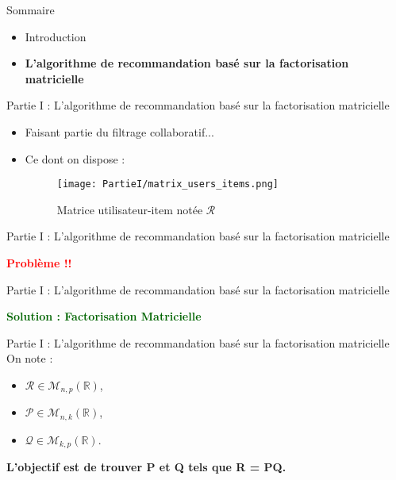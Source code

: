 \newcommand{\PartieI}{Partie I : L'algorithme de recommandation basé sur la factorisation matricielle}

\begin{frame}{Sommaire}
    \begin{itemize}
        \item Introduction
        \item \textbf{L'algorithme de recommandation basé sur la factorisation matricielle}
    \end{itemize}
\end{frame}

\begin{frame}{\PartieI}
    \begin{itemize}
        \item Faisant partie du filtrage collaboratif...
        \item {
              Ce dont on dispose :
              \begin{figure}[htbp]
                  \centering
                  \hspace{80pt}
                  \texttt{[image: PartieI/matrix\_users\_items.png]}
                  \caption{Matrice utilisateur-item notée $\mathcal{R}$}
                  \label{fig:matrix-user-item}
              \end{figure}
              }
    \end{itemize}
\end{frame}

\begin{frame}{\PartieI}
    \begin{center}
        \textcolor{red}{\textbf{\large{Problème !!}}}
    \end{center}
\end{frame}

\begin{frame}{\PartieI}
    \begin{center}
        \textcolor{darkgreen}{\textbf{\large{Solution : Factorisation Matricielle}}}
    \end{center}
\end{frame}

\begin{frame}{\PartieI}
    On note :
    \begin{itemize}
        \item $\mathcal{R} \in \mathcal{M}_{n,p}(\mathbb{R})$,
        \item $\mathcal{P} \in \mathcal{M}_{n,k}(\mathbb{R})$,
        \item $\mathcal{Q} \in \mathcal{M}_{k,p}(\mathbb{R})$.
    \end{itemize}
    \begin{center}
        \textbf{L'objectif est de trouver P et Q tels que R = PQ.}
    \end{center}
\end{frame}

